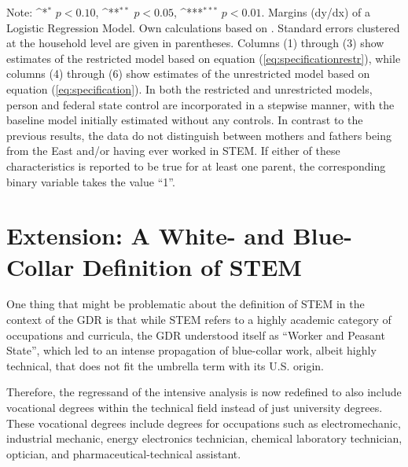 \documentclass[a4paper, oneside, hyperfootnotes = false]{article}
\def\sym#1{\ifmmode^{#1}\else\(^{#1}\)\fi}
\begin{document}
{\begin{landscape}
\begin{table}[ht]
\begin{center}
			\vspace{2mm}
			
			\parbox{15cm}{
				\linespread{1}\footnotesize Note: \sym{*} \(p<0.10\), \sym{**} \(p<0.05\), \sym{***} \(p<0.01\). Margins (dy/dx) of a Logistic Regression Model. Own calculations based on \cite{SOEP2023}. Standard errors clustered at the household level are given in parentheses. Columns (1) through (3) show estimates of the restricted model based on equation (\ref{eq:specificationrestr}), while columns (4) through (6) show estimates of the unrestricted model based on equation (\ref{eq:specification}). In both the restricted and unrestricted models, person and federal state control are incorporated in a stepwise manner, with the baseline model initially estimated without any controls. In contrast to the previous results, the data do not distinguish between mothers and fathers being from the East and/or having ever worked in STEM. If either of these characteristics is reported to be true for at least one parent, the corresponding binary variable takes the value ``1''.}
			
		\end{center}
	\end{table}
\end{landscape}

\clearpage

\section{Extension: A White- and Blue-Collar Definition of STEM}
\label{extension}

One thing that might be problematic about the definition of STEM in the context of the GDR is that while STEM refers to a highly academic category of occupations and curricula, the GDR understood itself as ``Worker and Peasant State'', which led to an intense propagation of blue-collar work, albeit highly technical, that does not fit the umbrella term with its U.S. origin.

Therefore, the regressand of the intensive analysis is now redefined to also include vocational degrees within the technical field instead of just university degrees.
These vocational degrees include degrees for occupations such as electromechanic, industrial mechanic, energy electronics technician, chemical laboratory technician, optician, and pharmaceutical-technical assistant.

}
\end{document}
